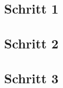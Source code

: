 


\clearpage
\subsection{Schritt 1}


\clearpage
\subsection{Schritt 2}


\clearpage
\subsection{Schritt 3}
